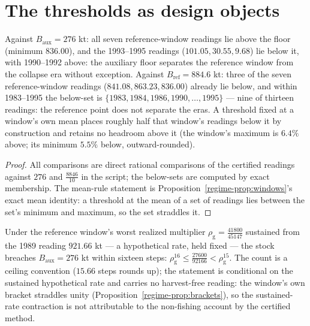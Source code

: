 \section{The thresholds as design objects}\label{regime-design}

\begin{proposition}\label{regime-prop:discrimination}
Against \(B_{\mathrm{aux}} = 276\) kt: all seven reference-window
readings lie above the floor (minimum \(836.00\)), and the 1993--1995
readings (\(101.05, 30.55, 9.68\)) lie below it, with 1990--1992
above: the auxiliary floor separates the reference window from the
collapse era without exception. Against
\(B_{\mathrm{ref}} = 884.6\) kt: three of the seven reference-window
readings (\(841.08, 863.23, 836.00\)) already lie below, and within
1983--1995 the below-set is \(\{1983, 1984, 1986, 1990, \dots, 1995\}\)
--- nine of thirteen readings: the reference point does not separate
the eras. A threshold fixed at a window's own mean places roughly half
that window's readings below it by construction and retains no
headroom above it (the window's maximum is \(6.4\%\) above; its
minimum \(5.5\%\) below, outward-rounded).
\end{proposition}

\begin{proof}
All comparisons are direct rational comparisons of the certified
readings against \(276\) and \(\tfrac{8846}{10}\) in the script; the
below-sets are computed by exact membership. The mean-rule statement
is Proposition~\ref{regime-prop:windows}'s exact mean identity: a threshold
at the mean of a set of readings lies between the set's minimum and
maximum, so the set straddles it.
\end{proof}

\begin{proposition}\label{regime-prop:sustained}
Under the reference window's worst realized multiplier
\(\rho_{\mathrm{g}} = \tfrac{41800}{45147}\) sustained from the 1989
reading \(921.66\) kt --- a hypothetical rate, held fixed ---
the stock breaches \(B_{\mathrm{aux}} = 276\) kt within sixteen steps:
\(\rho_{\mathrm{g}}^{16} \le \tfrac{27600}{92166} < \rho_{\mathrm{g}}^{15}\).
The count is a ceiling convention (\(15.66\) steps rounds up); the
statement is conditional on the sustained hypothetical rate and
carries no harvest-free reading: the window's own bracket straddles
unity (Proposition~\ref{regime-prop:brackets}), so the sustained-rate
contraction is not attributable to the non-fishing account by the
certified method.
\end{proposition}

